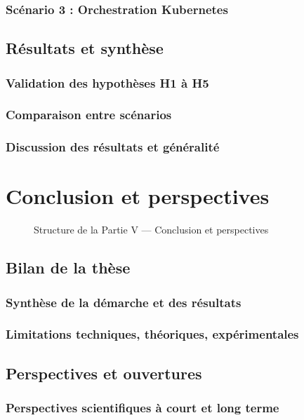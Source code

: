 \documentclass[ twoside,openright,titlepage,numbers=noenddot,headinclude,%
                footinclude=true,cleardoublepage=empty,abstractoff, %
                BCOR=5mm,paper=a4,fontsize=11pt,%
                french,american,%
                ]{scrreprt}
\begin{document}
\section{Scénario 3 : Orchestration Kubernetes}

\chapter{Résultats et synthèse}
\section{Validation des hypothèses H1 à H5}
\section{Comparaison entre scénarios}
\section{Discussion des résultats et généralité}

\part{Conclusion et perspectives}

\begin{figure}[h!]
    \centering
    
    \caption{Structure de la Partie V — Conclusion et perspectives}
\end{figure}

\chapter{Bilan de la thèse}

\section{Synthèse de la démarche et des résultats}

\section{Limitations techniques, théoriques, expérimentales}

\chapter{Perspectives et ouvertures}
\section{Perspectives scientifiques à court et long terme}
\end{document}

